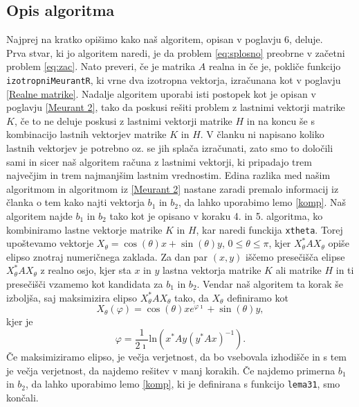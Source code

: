 \documentclass[12pt,a4paper]{amsart}
\theoremstyle{definition}
\theoremstyle{plain}
\begin{document}
\subsection{Opis algoritma}
Najprej na kratko opišimo kako naš algoritem, opisan v poglavju 6, deluje. \\
Prva stvar, ki jo algoritem naredi, je da problem \eqref{eq:splosno} preobrne v začetni problem \eqref{eq:zac}. Nato preveri, če je matrika $A$ realna in če je, pokliče funkcijo \verb+izotropniMeurantR+, ki vrne dva izotropna vektorja, izračunana kot v poglavju \ref{Realne matrike}. Nadalje algoritem uporabi isti postopek kot je opisan v poglavju \ref{Meurant 2}, tako da poskusi rešiti problem z lastnimi vektorji matrike $K$, če to ne deluje poskusi z lastnimi vektorji matrike $H$ in na koncu še s kombinacijo lastnih vektorjev matrike $K$ in $H$. V članku \cite{meurant} ni napisano koliko lastnih vektorjev je potrebno oz. se jih splača izračunati, zato smo to določili sami in sicer naš algoritem računa z lastnimi vektorji, ki pripadajo trem največjim in trem najmanjšim lastnim vrednostim. Edina razlika med našim algoritmom in algoritmom iz \ref{Meurant 2} nastane zaradi premalo informacij iz članka \cite{meurant} o tem kako najti vektorja $b_1$ in $b_2$, da lahko uporabimo lemo \ref{komp}. Naš algoritem najde $b_1$ in $b_2$ tako kot je opisano v koraku 4. in 5. algoritma, ko kombiniramo lastne vektorje matrike $K$ in $H$, kar naredi funckija \verb+xtheta+. Torej upoštevamo vektorje $X_\theta =\cos(\theta)x+\sin(\theta)y$, $0\le\theta\le\pi$, kjer $X_\theta ^\ast AX_\theta$ opiše elipso znotraj numeričnega zaklada. Za dan par $(x,y)$ iščemo presečišča elipse $X_\theta ^\ast AX_\theta$ z realno osjo, kjer sta $x$ in $y$ lastna vektorja matrike $K$ ali matrike $H$ in ti presečišči vzamemo kot kandidata za $b_1$ in $b_2$. Vendar naš algoritem ta korak še izboljša, saj maksimizira elipso $X_\theta ^\ast AX_\theta$ tako, da $X_\theta$ definiramo kot $$X_\theta (\varphi) =\cos(\theta)x e^{\varphi \imath}+\sin(\theta)y,$$ kjer je $$\varphi = \frac{1}{2\imath} \text{ln}(x^\ast Ay (y^\ast Ax)^{-1}).$$ Če maksimiziramo elipso, je večja verjetnost, da bo vsebovala izhodišče in s tem je večja verjetnost, da najdemo rešitev v manj korakih. Če najdemo primerna $b_1$ in $b_2$, da lahko uporabimo lemo \ref{komp}, ki je definirana s funkcijo \verb+lema31+, smo končali.
\end{document}
